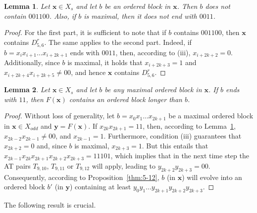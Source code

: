 \documentclass{sn-jnl}
\newtheorem{lem}{Lemma}%
\newcommand{\xodd}{X_{odd}}
\newcommand{\xconst}{X_{s}}
\newcommand{\bx}{\mathbf{x}}
\newcommand{\by}{\mathbf{y}}
\begin{document}
\begin{lem}\label{lem:D56}
Let $\bx\in \xconst$ and let $b$ be an ordered block in $\bx$. Then $b$ does not contain $001100$. Also, if $b$ is maximal, then it does not end with $0011$.
\end{lem}
\begin{proof}
For the first part, it is sufficient to note that if $b$ contains $001100$, then $\bx$ contains $D_{5,6}^r$. The same applies to the second part. Indeed, if $b=x_{i}x_{i+1}\ldots x_{i+2k+1}$ ends with $0011$, then, according to (iii), $x_{i+2k+2}=0$. Additionally, since $b$ is maximal, it holds that $x_{i+2k+3}=1$ and $x_{i+2k+4}x_{i+2k+5}\neq 00$, and hence $\bx$ contains $D_{5,6}^r$.
\end{proof}

\begin{lem}\label{lem:longer}
Let $\bx\in \xconst$ and let $b$ be any maximal ordered block in $\bx$. If $b$ ends with $11$, then $F(\bx)$ contains an ordered block longer than $b$.
\end{lem}
\begin{proof}
Without loss of generality, let $b=x_{0}x_{1}\ldots x_{2k+1}$ be a maximal ordered block in $\bx\in\xodd$ and $\by=F(\bx)$. If $x_{2k}x_{2k+1}=11$, then, according to Lemma~\ref{lem:D56}, $x_{2k-2}x_{2k-1}\neq 00$, and $x_{2k-1}=1$. Furthermore, condition (iii) guarantees that $x_{2k+2}=0$ and, since $b$ is maximal, $x_{2k+3}=1$. But this entails that $x_{2k-1}x_{2k}x_{2k+1}x_{2k+2}x_{2k+3}=11101$, which implies that in the next time step the AT pairs $T_{9,10}$, $T_{9,11}$ or $T_{9,12}$ will apply, leading to $y_{2k+2}y_{2k+3}=00$. Consequently, according to Proposition~\ref{thm:5-12}, $b$ (in $\bx$) will evolve into an ordered block $b'$ (in $\by$) containing at least $y_{0}y_{1}\ldots y_{2k+1}y_{2k+2}y_{2k+3}$.
\end{proof}

The following result is crucial. 
\end{document}
